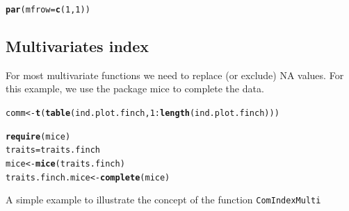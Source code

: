 \documentclass[12pt]{article}\usepackage[]{graphicx}\usepackage[]{color}
\makeatletter
\newcommand{\hlnum}[1]{\textcolor[rgb]{0.686,0.059,0.569}{#1}}%
\newcommand{\hlopt}[1]{\textcolor[rgb]{0,0,0}{#1}}%
\newcommand{\hlstd}[1]{\textcolor[rgb]{0.345,0.345,0.345}{#1}}%
\newcommand{\hlkwb}[1]{\textcolor[rgb]{0.69,0.353,0.396}{#1}}%
\newcommand{\hlkwc}[1]{\textcolor[rgb]{0.333,0.667,0.333}{#1}}%
\newcommand{\hlkwd}[1]{\textcolor[rgb]{0.737,0.353,0.396}{\textbf{#1}}}%
\newenvironment{kframe}{%
 \def\at@end@of@kframe{}%
 \ifinner\ifhmode%
  \def\at@end@of@kframe{\end{minipage}}%
  \begin{minipage}{\columnwidth}%
 \fi\fi%
 \def\FrameCommand##1{\hskip\@totalleftmargin \hskip-\fboxsep
 \colorbox{shadecolor}{##1}\hskip-\fboxsep
     \hskip-\linewidth \hskip-\@totalleftmargin \hskip\columnwidth}%
 \MakeFramed {\advance\hsize-\width
   \@totalleftmargin\z@ \linewidth\hsize
   \@setminipage}}%
 {\par\unskip\endMakeFramed%
 \at@end@of@kframe}
\newenvironment{knitrout}{}{} %
\makeatother
\begin{document}
\begin{knitrout}
\begin{kframe}\begin{alltt}
\hlkwd{par}\hlstd{(}\hlkwc{mfrow}\hlstd{=}\hlkwd{c}\hlstd{(}\hlnum{1}\hlstd{,}\hlnum{1}\hlstd{))}
\end{alltt}
\end{kframe}
\end{knitrout}



\newpage

\subsection{Multivariates index}

For most multivariate functions we need to replace (or exclude) NA values. For this example, we use the package mice to complete the data.

\begin{knitrout}
\color{fgcolor}\begin{kframe}
\begin{alltt}
\hlstd{comm}\hlkwb{<-}\hlkwd{t}\hlstd{(}\hlkwd{table}\hlstd{(ind.plot.finch,}\hlnum{1}\hlopt{:}\hlkwd{length}\hlstd{(ind.plot.finch)))}

\hlkwd{require}\hlstd{(mice)}
\hlstd{traits}\hlkwb{=}\hlstd{traits.finch}
\hlstd{mice}\hlkwb{<-}\hlkwd{mice}\hlstd{(traits.finch)}
\hlstd{traits.finch.mice}\hlkwb{<-}\hlkwd{complete}\hlstd{(mice)}
\end{alltt}
\end{kframe}
\end{knitrout}

A simple example to illustrate the concept of the function \tt{ComIndexMulti}
\end{document}
